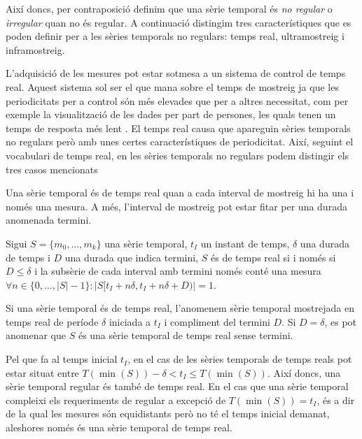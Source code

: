Així doncs, per contraposició definim que una sèrie temporal és
\emph{no regular} o \emph{irregular} quan no és regular.  A
continuació distingim tres característiques que es poden definir per a les
sèries temporals no regulars: temps real, ultramostreig i
inframostreig.

L'adquisició de les mesures pot estar sotmesa a un sistema de
control de temps real. Aquest sistema sol ser el que mana sobre el
temps de mostreig ja que les periodicitats per a control són més
elevades que per a altres necessitat, com per exemple la visualització
de les dades per part de persones, les quals tenen un temps de
resposta més lent \parencite[cap.~1]{kopetz11:realtime}.  El temps
real causa que apareguin sèries temporals no regulars però amb unes
certes característiques de periodicitat.  Així, seguint el vocabulari
de temps real, en les sèries temporals no regulars podem distingir els
tres casos mencionats


Una sèrie temporal és de temps real quan a cada interval de mostreig
hi ha una i només una mesura. A més, l'interval de mostreig pot estar
fitar per una durada anomenada termini.
\begin{definition}
  \label{def:st:tempsreal}
  Sigui $S=\{m_0,\dotsc,m_k\}$ una sèrie temporal, $t_I$ un instant de
  temps, $\delta$ una durada de temps i $D$ una durada que indica
  termini, $S$ és de temps real si i només si $D\leq\delta$ i la
  subsèrie de cada interval amb termini només conté una mesura $\forall
  n\in\{0,\ldots,|S|-1\}: |S[t_I+n\delta,t_I+n\delta+D)| = 1$.
\end{definition}

Si una sèrie temporal és de temps real, l'anomenem sèrie temporal
mostrejada en temps real de període $\delta$ iniciada a $t_I$ i
compliment del termini $D$.  Si $D=\delta$, es pot anomenar que $S$ és
una sèrie temporal de temps real sense termini.

Pel que fa al temps inicial $t_I$, en el cas de les sèries temporals
de temps reals pot estar situat entre $T(\min(S))-\delta < t_I \leq
T(\min(S))$.  Així doncs, una sèrie temporal regular és també de temps
real. En el cas que una sèrie temporal compleixi els requeriments de
regular a excepció de $T(\min(S))=t_I$, és a dir de la qual les
mesures són equidistants però no té el temps inicial demanat,
aleshores només és una sèrie temporal de temps real.




